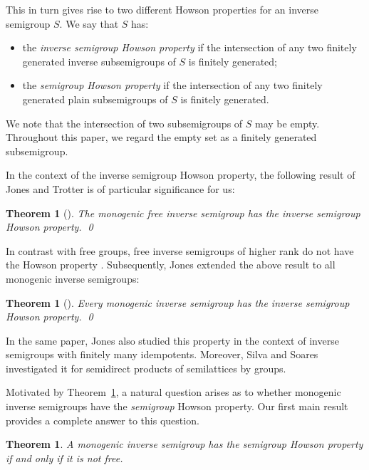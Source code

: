 \documentclass[reqno]{amsart}
\theoremstyle{plain}
\newtheorem{thm}[lem]{Theorem}
\newtheorem{thmAB}{Theorem}
\theoremstyle{definition}
\newenvironment{bulletmidsentence}{\begin{itemize}[topsep=0mm, leftmargin=8mm, itemsep=1mm]
}{\end{itemize}}
\numberwithin{equation}{section}
\begin{document}
This in turn gives rise to two different Howson properties for an inverse semigroup $S$. We say that $S$ has:
\begin{bulletmidsentence}
\item the \emph{inverse semigroup Howson property} if the intersection of any two finitely generated inverse subsemigroups of $S$ is finitely generated;
\item the \emph{semigroup Howson property} if the intersection of any two finitely generated plain subsemigroups of $S$ is finitely generated.
\end{bulletmidsentence}

We note that the intersection of two subsemigroups of $S$ may be empty. Throughout this paper, we regard the empty set as a finitely generated subsemigroup.

In the context of the inverse semigroup Howson property, the following result of Jones and Trotter \cite{JonesTrotter} is of particular significance for us:



\begin{thm}[\cite{JonesTrotter}]
\label{thm:JonesTrotter}
The monogenic free inverse semigroup has the inverse semigroup Howson property. \hfill\qed
\end{thm}

In contrast with free groups, free inverse semigroups of higher rank do not have the Howson property \cite{JonesTrotter}. Subsequently, Jones \cite{Jones} extended the above result to all monogenic inverse semigroups: 

\begin{thm}[\cite{Jones}]
\label{thm:Jones}
Every monogenic inverse semigroup has the inverse semigroup Howson property. \hfill\qed
\end{thm}

In the same paper, Jones \cite{Jones} also studied this property in the context of inverse semigroups with finitely many idempotents. Moreover, Silva and Soares \cite{SilvaSoares} investigated it for semidirect products of semilattices by groups.


Motivated by Theorem~\ref{thm:Jones}, a natural question arises as to whether monogenic inverse semigroups have the \emph{semigroup} Howson property. Our first main result provides a complete answer to this question.



\begin{thmAB}
\label{thmA:Howson}
A monogenic inverse semigroup has the semigroup Howson property if and only if it is not free.
\end{thmAB}
\end{document}
